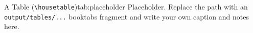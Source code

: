 %
  {A Table (\texttt{\textbackslash housetable})}{tab:placeholder}{%
  Placeholder. Replace the path with an \texttt{output/tables/...} booktabs fragment and
  write your own caption and notes here.}
